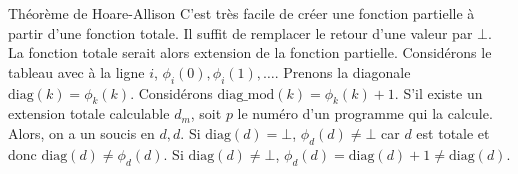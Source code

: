 \begin{mcqs}
  {Théorème de Hoare-Allison}
  {C'est très facile de créer une fonction partielle à partir d'une fonction totale.
  Il suffit de remplacer le retour d'une valeur par $\bot$. La fonction totale serait alors extension de la fonction partielle.}
  {Considérons le tableau avec à la ligne $i$, $\phi_i(0), \phi_i(1), \ldots$.
  Prenons la diagonale $\mathrm{diag}(k) = \phi_k(k)$.
  Considérons $\mathrm{diag\_mod}(k) = \phi_k(k)+1$.
  S'il existe un extension totale calculable $d_m$, soit $p$ le numéro d'un programme qui la calcule.
  Alors, on a un soucis en $d,d$.
  Si $\mathrm{diag}(d) = \bot$, $\phi_d(d) \neq \bot$ car $d$ est totale et donc $\mathrm{diag}(d) \neq \phi_d(d)$.
  Si $\mathrm{diag}(d) \neq \bot$, $\phi_d(d) = \mathrm{diag}(d) + 1 \neq \mathrm{diag}(d)$.}
\end{mcqs}
